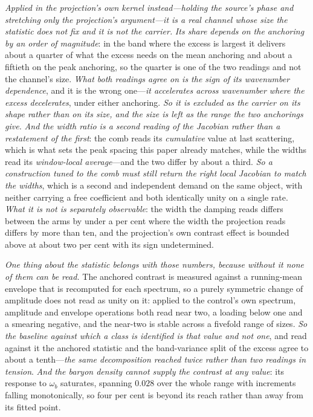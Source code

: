 \documentclass[11pt,a4paper]{article}
\theoremstyle{plain}
\theoremstyle{definition}
\theoremstyle{remark}
\begin{document}
\emph{Applied in the projection's own kernel instead---holding the source's phase and stretching only the
projection's argument---it is a real channel whose size the statistic does not fix and it is not the carrier.}
\emph{Its share depends on the anchoring by an order of magnitude}: in the band where the excess is largest it
delivers about a quarter of what the excess needs on the mean anchoring and about a fiftieth on the peak
anchoring, so the quarter is one of the two readings and not the channel's size. \emph{What both readings agree
on is the sign of its wavenumber dependence}, and it is the wrong one---\emph{it accelerates across wavenumber
where the excess decelerates}, under either anchoring. \emph{So it is excluded as the carrier on its shape
rather than on its size, and the size is left as the range the two anchorings give.} \emph{And the width ratio is a second reading of the Jacobian rather than a restatement of the
first}: the comb reads its \emph{cumulative} value at last scattering, which is what sets the peak spacing
this paper already matches, while the widths read its \emph{window-local average}---and the two differ by
about a third. \emph{So a construction tuned to the comb must still return the right local Jacobian to match
the widths}, which is a second and independent demand on the same object, with neither carrying a free
coefficient and both identically unity on a single rate. \emph{What it is not is separately observable}: the
width the damping reads differs between the arms by under a per cent where the width the projection reads
differs by more than ten, and the projection's own contrast effect is bounded above at about two per cent with
its sign undetermined.

\emph{One thing about the statistic belongs with those numbers, because without it none of them can be
read.} The anchored contrast is measured against a running-mean envelope that is recomputed for each
spectrum, so a purely symmetric change of amplitude does not read as unity on it: applied to the control's
own spectrum, amplitude and envelope operations both read near two, a loading below one and a smearing
negative, and the near-two is stable across a fivefold range of sizes. \emph{So the baseline against which a
class is identified is that value and not one}, and read against it the anchored statistic and the
band-variance split of the excess agree to about a tenth---\emph{the same decomposition reached twice
rather than two readings in tension}. \emph{And the baryon density cannot supply the contrast at any value}: its
response to $\omega_b$ saturates, spanning $0.028$ over the whole range with increments falling
monotonically, so four per cent is beyond its reach rather than away from its fitted
point.
\end{document}
